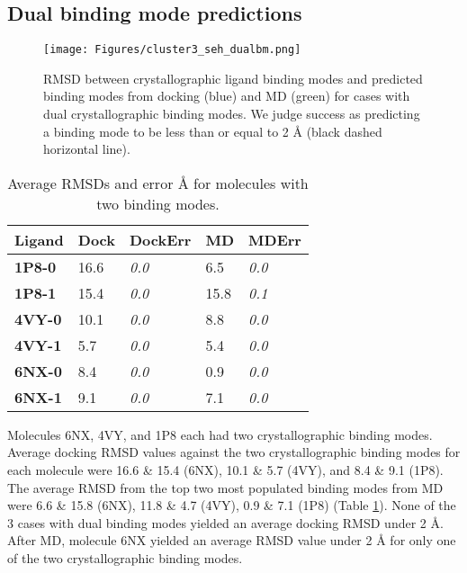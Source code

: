 \documentclass[journal=jcisd8,manuscript=article]{achemso}
\begin{document}
\subsection{Dual binding mode predictions}
\begin{figure}
    \centering
    \texttt{[image: Figures/cluster3\_seh\_dualbm.png]}
    \caption[SEH MD Dual Binding Mode Ligands]{RMSD between crystallographic ligand binding modes and predicted binding modes from docking (blue) and MD (green) for cases with dual crystallographic binding modes. We judge success as predicting a binding mode to be less than or equal to 2 {\AA} (black dashed horizontal line). }
    \label{fig:rmsd-dualbm}
\end{figure}

\begin{table}[]
\begin{tabular}{|l|l|l|l|l|}
\hline
\textbf{Ligand} & \textbf{Dock} & \textbf{DockErr} & \textbf{MD} & \textbf{MDErr} \\ \hline
\textbf{1P8-0}  & 16.6          & \textit{0.0}     & 6.5         & \textit{0.0}   \\ \hline
\textbf{1P8-1}  & 15.4          & \textit{0.0}     & 15.8        & \textit{0.1}   \\ \hline
\textbf{4VY-0}  & 10.1          & \textit{0.0}     & 8.8         & \textit{0.0}   \\ \hline
\textbf{4VY-1}  & 5.7           & \textit{0.0}     & 5.4         & \textit{0.0}   \\ \hline
\textbf{6NX-0}  & 8.4           & \textit{0.0}     & 0.9         & \textit{0.0}   \\ \hline
\textbf{6NX-1}  & 9.1           & \textit{0.0}     & 7.1         & \textit{0.0}   \\ \hline
\end{tabular}
\caption{Average RMSDs and error {\AA} for molecules with two binding modes.}
\label{table:dualbm}
\end{table}


Molecules 6NX, 4VY, and 1P8 each had two crystallographic binding modes.
Average docking RMSD values against the two crystallographic binding modes for each molecule were 16.6 \& 15.4 (6NX), 10.1 & 5.7 (4VY), and 8.4 \& 9.1 (1P8).
The average RMSD from the top two most populated binding modes from MD were 6.6 & 15.8 (6NX), 11.8 \& 4.7 (4VY), 0.9 \& 7.1 (1P8) (Table \ref{table:dualbm}).
None of the 3 cases with dual binding modes yielded an average docking RMSD under 2 {\AA}.
After MD, molecule 6NX yielded an average RMSD value under 2 {\AA} for only one of the two crystallographic binding modes. 
\end{document}
